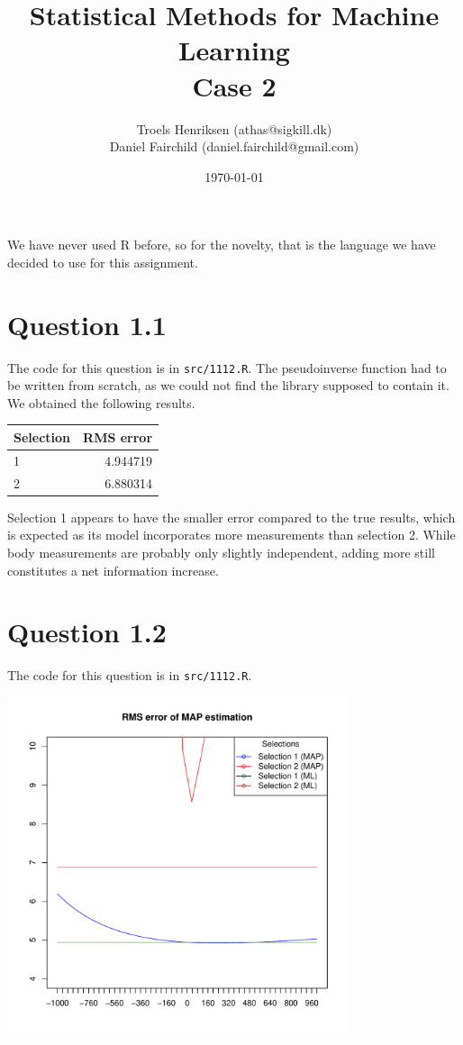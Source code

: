 \documentclass[a4paper, oneside, final]{memoir}
\title{Statistical Methods for Machine Learning\\Case 2}
\author{Troels Henriksen (athas@sigkill.dk) \\ Daniel Fairchild
  (daniel.fairchild@gmail.com)}
\date{\today}
\begin{document}
\maketitle

We have never used R before, so for the novelty, that is the language
we have decided to use for this assignment.

\section*{Question 1.1}

The code for this question is in \texttt{src/1112.R}.  The
pseudoinverse function had to be written from scratch, as we could not
find the library supposed to contain it.  We obtained the following
results.

\begin{tabular}{|l|r|}
  \textbf{Selection} & \textbf{RMS error} \\\hline
  1 & 4.944719 \\\hline
  2 & 6.880314
\end{tabular}

Selection 1 appears to have the smaller error compared to the true
results, which is expected as its model incorporates more measurements
than selection 2.  While body measurements are probably only slightly
independent, adding more still constitutes a net information increase.
\newpage
\section*{Question 1.2}

The code for this question is in \texttt{src/1112.R}.

\includegraphics[width=10cm]{img/question12-plot.pdf}
\end{document}
